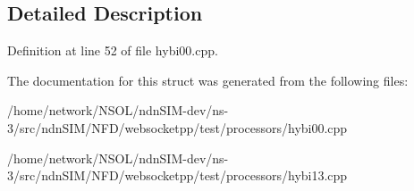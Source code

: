 \subsection{Detailed Description}


Definition at line 52 of file hybi00.\+cpp.



The documentation for this struct was generated from the following files\+:\begin{DoxyCompactItemize}
\item 
/home/network/\+N\+S\+O\+L/ndn\+S\+I\+M-\/dev/ns-\/3/src/ndn\+S\+I\+M/\+N\+F\+D/websocketpp/test/processors/hybi00.\+cpp\item 
/home/network/\+N\+S\+O\+L/ndn\+S\+I\+M-\/dev/ns-\/3/src/ndn\+S\+I\+M/\+N\+F\+D/websocketpp/test/processors/hybi13.\+cpp\end{DoxyCompactItemize}
